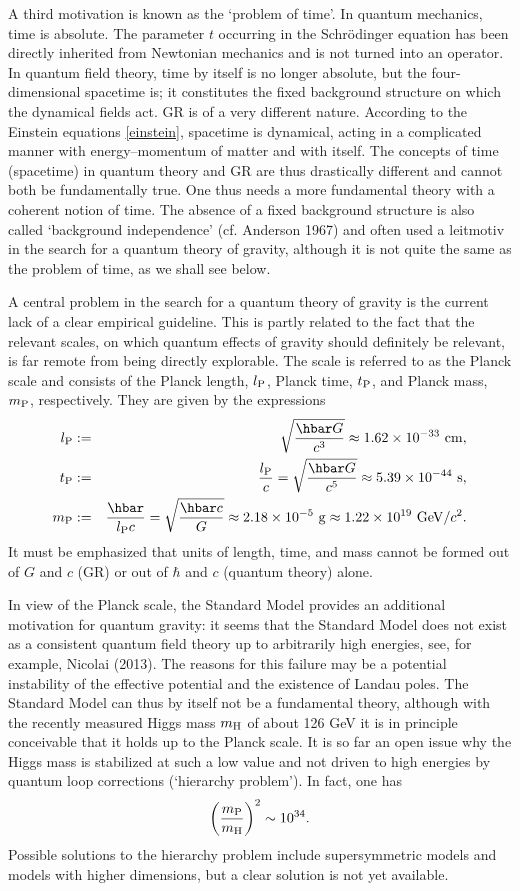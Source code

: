 \documentclass[12pt,a4paper]{article}
\newcommand{\be}{\begin{equation}}
\newcommand{\ee}{\end{equation}}
\newcommand{\bea}{\begin{eqnarray}}
\newcommand{\eea}{\end{eqnarray}}
\newcommand{\lb}{\label}
\begin{document}
A third motivation is known as the `problem of time'. In quantum
mechanics, time is absolute. The parameter $t$ occurring in the
Schr\"odinger equation has been directly inherited from Newtonian
mechanics and is not turned into an operator. In quantum field theory,
time by itself is no longer absolute, but the four-dimensional
spacetime is; it constitutes the fixed background structure on which
the dynamical fields act. GR is of a very different nature. According
to the Einstein equations \eqref{einstein}, spacetime is dynamical,
acting in a complicated manner with energy--momentum of matter and
with itself. The concepts of time (spacetime) in quantum theory and GR
are thus drastically different and cannot both be fundamentally
true. One thus needs a more fundamental theory with a coherent notion
of time. The absence of a fixed background structure is also called
`background independence' (cf. Anderson 1967) and often used a
leitmotiv in the search for 
a quantum theory of gravity, although it is not quite the same as the
problem of time, as we shall see below.

A central problem in the search for a quantum theory of gravity is the
current lack of a clear empirical guideline. This is partly related to
the fact that the relevant scales, on which quantum effects of gravity
should definitely be relevant, is far remote from being directly
explorable. The scale is referred to as the Planck scale and consists of
the Planck length, $l_{\rm P}$, Planck time, $t_{\rm P}$,
 and Planck mass, $m_{\rm P}$, respectively. They are given by the expressions
\bea 
l_{\rm P} &:=& \sqrt{\frac{\hbar G}{c^3}} \approx 1.62\times 10^{-33}\ 
{\rm cm} ,
\lb{lP}\\
t_{\rm P} &:=& \frac{l_{\rm P}}{c}=\sqrt{\frac{\hbar G}{c^5}}
\approx 5.39\times 10^{-44}\ {\rm s} ,\\
\lb{tP}
m_{\rm P} &:=& \frac{\hbar}{l_{\rm P}c}=\sqrt{\frac{\hbar c}{G}}
\approx 2.18\times 10^{-5}\ {\rm g}\approx 1.22 \times 10^{19}\ {\rm GeV}/c^2 .
\lb{mP}
\eea 
It must be emphasized that units of length, time, and mass cannot be
formed out of $G$ and $c$ (GR) or out of 
$\hbar$ and $c$ (quantum theory) alone. 

In view of the Planck scale, the Standard Model provides an additional
motivation for quantum gravity:
it seems that the Standard Model does not exist as a consistent quantum
field theory up to arbitrarily high energies, see, for example,
Nicolai (2013). The reasons for this
failure may be a potential instability of the effective potential
and the existence of Landau poles. The Standard Model can thus by itself not
be a fundamental theory, although with the recently measured
Higgs mass $m_{\rm H}$ of about 126 GeV it is in principle conceivable that it
holds up to the Planck scale. It is so far an open issue why the Higgs
mass is stabilized at such a low value and not driven to high energies
by quantum loop corrections (`hierarchy problem'). In fact, one has
\be
\left(\frac{m_{\rm P}}{m_{\rm H}}\right)^2\sim 10^{34}.
\ee
Possible solutions to the hierarchy problem include supersymmetric
models and models with higher dimensions, but a clear solution is not
yet available.
\end{document}
